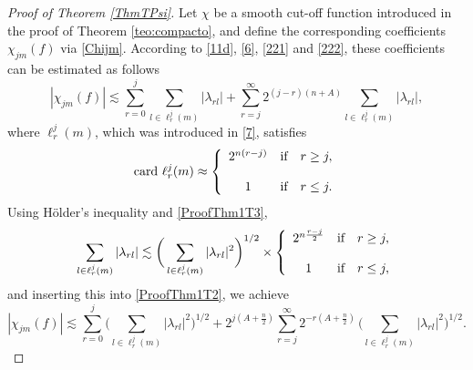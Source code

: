 \documentclass[11pt, a4paper,leqno]{amsart}
\theoremstyle{plain}
\numberwithin{equation}{section}
\theoremstyle{definition}
\theoremstyle{remark}
\begin{document}
\begin{proof}[Proof of Theorem \ref{ThmTPsi}]
Let $\chi$ be a smooth cut-off function introduced in the proof of Theorem  \ref{teo:compacto}, and define the corresponding coefficients $\chi_{jm}(f)$ via
\eqref{Chijm}. According to \eqref{11d}, \eqref{6}, \eqref{221} and \eqref{222}, these coefficients can be estimated as follows
%
\begin{equation}
|\chi_{jm}(f)|  \lesssim\sum_{r=0}^{j}\sum_{l\in\ell_{r}^{j}(m)}|\lambda_{rl}|+\sum
_{r=j}^{\infty}2^{(j-r)(n+A)}\sum_{l\in\ell_{r}^{j}(m)}|\lambda_{rl}|,
\label{ProofThm1T2}%
\end{equation}
where $\ell^j_r(m)$, which was introduced in \eqref{7}, satisfies
\begin{equation}
\text{card }\ell_{r}^{j}(m)\approx\left\{
\begin{array}
[c]{cl}%
2^{n(r-j)} & \text{if}\quad r\geq j,\\
& \\
1 & \text{if}\quad r\leq j.
\end{array}
\right.  \label{ProofThm1T3}%
\end{equation}
Using H\"{o}lder's inequality and \eqref{ProofThm1T3},
\[
\sum_{l\in\ell_{r}^{j}(m)}|\lambda_{rl}|\lesssim\bigg(\sum_{l\in\ell_{r}%
^{j}(m)}|\lambda_{rl}|^{2}\bigg)^{1/2}\times\left\{
\begin{array}
[c]{cl}%
2^{n\frac{r-j}{2}} & \text{if}\quad r\geq j,\\
& \\
1 & \text{if}\quad r\leq j,
\end{array}
\right.
\]
and inserting this into \eqref{ProofThm1T2}, we achieve
\begin{equation}
|\chi_{jm}(f)|\lesssim\sum_{r=0}^{j}\bigg(\sum_{l\in\ell_{r}^{j}(m)}%
|\lambda_{rl}|^{2}\bigg)^{1/2}+2^{j(A+\frac{n}{2})}\sum_{r=j}^{\infty
}2^{-r(A+\frac{n}{2})}\,\bigg(\sum_{l\in\ell_{r}^{j}(m)}|\lambda_{rl}%
|^{2}\bigg)^{1/2}. \label{ProofThm1T4}%
\end{equation}



\end{proof}
\end{document}
